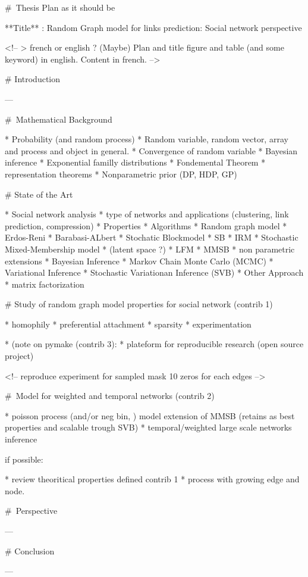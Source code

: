 # Thesis Plan as it should be

**Title** : Random Graph model for links prediction: Social network perspective

<!--
> french or english ?
(Maybe) Plan and title figure and table (and some keyword) in english.
Content in french.
-->



# Introduction

---

# Mathematical Background

* Probability (and random process)
    * Random variable, random vector, array and process and object in general.
    * Convergence of random variable
    * Bayesian inference
* Exponential familly distributions
* Fondemental Theorem
    * representation theorems
* Nonparametric prior (DP, HDP, GP)

# State of the Art

* Social network analysis
    * type of networks and applications (clustering, link prediction, compression)
    * Properties
    * Algorithms 
* Random graph model
    * Erdos-Reni
    * Barabasi-ALbert
    * Stochatic Blockmodel
        * SB
        * IRM
    * Stochastic Mixed-Membership model
        * (latent space ?)
        * LFM
        * MMSB
        * non parametric extensions
* Bayesian Inference
    * Markov Chain Monte Carlo (MCMC)
    * Variational Inference
    * Stochastic Variationan Inference (SVB)
* Other Approach
    * matrix factorization

# Study of random graph model properties for social network (contrib 1)

* homophily
* preferential attachment
* sparsity
* experimentation

* (note on pymake (contrib 3): * plateform for reproducible research (open source project)

<!-- reproduce experiment for sampled mask 10 zeros for each edges -->


# Model for weighted and temporal networks (contrib 2)

* poisson process (and/or neg bin, ) model extension of MMSB (retains as best properties and scalable trough SVB)
* temporal/weighted large scale networks inference

if possible:

* review theoritical properties defined contrib 1
* process with growing edge and node.



# Perspective

---

# Conclusion

---

